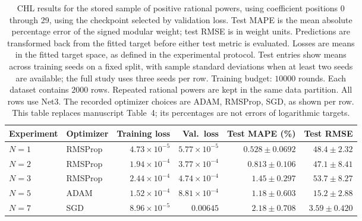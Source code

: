 \begin{table}[!htbp]
\centering
\small
\setlength{\tabcolsep}{4pt}
\renewcommand{\arraystretch}{1.18}
\begin{tabular}{@{}llrrrr@{}}
\toprule
Experiment & Optimizer & Training loss & Val.\ loss & Test MAPE (\%) & Test RMSE \\
\midrule
$N=1$ & RMSProp & $4.73\times10^{-5}$ & $5.77\times10^{-5}$ & $0.528\pm0.0692$ & $48.4\pm2.32$ \\
$N=2$ & RMSProp & $1.94\times10^{-4}$ & $3.77\times10^{-4}$ & $0.813\pm0.106$ & $47.1\pm8.41$ \\
$N=3$ & RMSProp & $2.44\times10^{-4}$ & $4.74\times10^{-4}$ & $1.45\pm0.297$ & $53.7\pm8.27$ \\
$N=5$ & ADAM & $1.52\times10^{-4}$ & $8.81\times10^{-4}$ & $1.18\pm0.603$ & $15.2\pm2.88$ \\
$N=7$ & SGD & $8.96\times10^{-5}$ & $0.00645$ & $2.18\pm0.708$ & $3.59\pm0.420$ \\
\bottomrule
\end{tabular}
\caption{\textsf{CHL results for the stored sample of positive rational powers, using coefficient positions 0 through 29, using the checkpoint selected by validation loss. Test MAPE is the mean absolute percentage error of the signed modular weight; test RMSE is in weight units. Predictions are transformed back from the fitted target before either test metric is evaluated. Losses are means in the fitted target space, as defined in the experimental protocol. Test entries show means across training seeds on a fixed split, with sample standard deviations when at least two seeds are available; the full study uses three seeds per row. Training budget: $10000$ rounds. Each dataset contains $2000$ rows. Repeated rational powers are kept in the same data partition. All rows use Net3. The recorded optimizer choices are ADAM, RMSProp, SGD, as shown per row. This table replaces manuscript Table~4; its percentages are not errors of logarithmic targets.}}
\label{tab:chl-revised-4-best}
\end{table}
